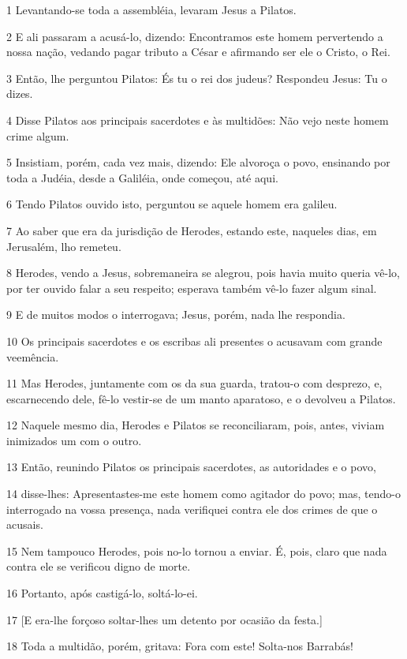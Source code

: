 \par 1 Levantando-se toda a assembléia, levaram Jesus a Pilatos.
\par 2 E ali passaram a acusá-lo, dizendo: Encontramos este homem pervertendo a nossa nação, vedando pagar tributo a César e afirmando ser ele o Cristo, o Rei.
\par 3 Então, lhe perguntou Pilatos: És tu o rei dos judeus? Respondeu Jesus: Tu o dizes.
\par 4 Disse Pilatos aos principais sacerdotes e às multidões: Não vejo neste homem crime algum.
\par 5 Insistiam, porém, cada vez mais, dizendo: Ele alvoroça o povo, ensinando por toda a Judéia, desde a Galiléia, onde começou, até aqui.
\par 6 Tendo Pilatos ouvido isto, perguntou se aquele homem era galileu.
\par 7 Ao saber que era da jurisdição de Herodes, estando este, naqueles dias, em Jerusalém, lho remeteu.
\par 8 Herodes, vendo a Jesus, sobremaneira se alegrou, pois havia muito queria vê-lo, por ter ouvido falar a seu respeito; esperava também vê-lo fazer algum sinal.
\par 9 E de muitos modos o interrogava; Jesus, porém, nada lhe respondia.
\par 10 Os principais sacerdotes e os escribas ali presentes o acusavam com grande veemência.
\par 11 Mas Herodes, juntamente com os da sua guarda, tratou-o com desprezo, e, escarnecendo dele, fê-lo vestir-se de um manto aparatoso, e o devolveu a Pilatos.
\par 12 Naquele mesmo dia, Herodes e Pilatos se reconciliaram, pois, antes, viviam inimizados um com o outro.
\par 13 Então, reunindo Pilatos os principais sacerdotes, as autoridades e o povo,
\par 14 disse-lhes: Apresentastes-me este homem como agitador do povo; mas, tendo-o interrogado na vossa presença, nada verifiquei contra ele dos crimes de que o acusais.
\par 15 Nem tampouco Herodes, pois no-lo tornou a enviar. É, pois, claro que nada contra ele se verificou digno de morte.
\par 16 Portanto, após castigá-lo, soltá-lo-ei.
\par 17 [E era-lhe forçoso soltar-lhes um detento por ocasião da festa.]
\par 18 Toda a multidão, porém, gritava: Fora com este! Solta-nos Barrabás!
